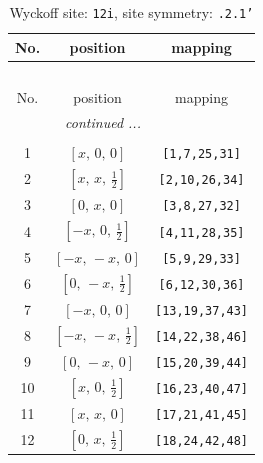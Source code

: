 \documentclass[fleqn,8pt]{jsarticle}
\begin{document}
\begin{longtable}{ccc}
\caption{Wyckoff site: {\tt 12i}, site symmetry: {\tt .2.1'}}
 \\
 \hline \hline
No. & position & mapping \\ \hline \endfirsthead

\multicolumn{2}{l}{\tablename\ \thetable{}} \\
 \hline \hline
No. & position & mapping \\ \hline \endhead

 \hline \hline
\multicolumn{2}{r}{\footnotesize\it continued ...} \\ \endfoot

 \hline \hline
\multicolumn{2}{r}{} \\ \endlastfoot

1 & $\left[ x,\, 0,\, 0 \right]$ & {\tt [1,7,25,31]} \\ \hline
2 & $\left[ x,\, x,\, \frac{1}{2} \right]$ & {\tt [2,10,26,34]} \\ \hline
3 & $\left[ 0,\, x,\, 0 \right]$ & {\tt [3,8,27,32]} \\ \hline
4 & $\left[ - x,\, 0,\, \frac{1}{2} \right]$ & {\tt [4,11,28,35]} \\ \hline
5 & $\left[ - x,\, - x,\, 0 \right]$ & {\tt [5,9,29,33]} \\ \hline
6 & $\left[ 0,\, - x,\, \frac{1}{2} \right]$ & {\tt [6,12,30,36]} \\ \hline
7 & $\left[ - x,\, 0,\, 0 \right]$ & {\tt [13,19,37,43]} \\ \hline
8 & $\left[ - x,\, - x,\, \frac{1}{2} \right]$ & {\tt [14,22,38,46]} \\ \hline
9 & $\left[ 0,\, - x,\, 0 \right]$ & {\tt [15,20,39,44]} \\ \hline
10 & $\left[ x,\, 0,\, \frac{1}{2} \right]$ & {\tt [16,23,40,47]} \\ \hline
11 & $\left[ x,\, x,\, 0 \right]$ & {\tt [17,21,41,45]} \\ \hline
12 & $\left[ 0,\, x,\, \frac{1}{2} \right]$ & {\tt [18,24,42,48]} \\
\end{longtable}
\renewcommand{\arraystretch}{1.2}
\end{document}
